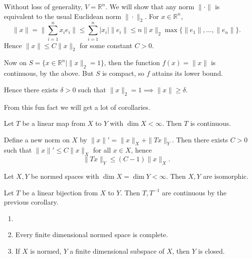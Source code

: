 \documentclass[12pt]{article}
\begin{document}
\begin{proofbox}
	Without loss of generality, $V = \mathbb{R}^{n}$. We will show that any norm $\|\cdot\|$ is equivalent to the usual Euclidean norm $\|\cdot\|_2$. For $x \in \mathbb{R}^{n}$,
	\[
		\|x\| = \biggl\| \sum_{i = 1}^{n} x_i e_i \biggr\| \leq \sum_{i = 1}^{n} |x_i| \|e_i\| \leq n \|x\|_2 \max\{\|e_1\|, \ldots, \|e_n\|\}.
	\]
	Hence $\|x\| \leq C \|x\|_2$ for some constant $C > 0$.

	Now on $S = \{x \in \mathbb{R}^{n} \mid \|x\|_2 = 1\}$, then the function $f(x) = \|x\|$ is continuous, by the above. But $S$ is compact, so $f$ attains its lower bound.

	Hence there exists $\delta > 0$ such that $\|x\|_2 = 1 \implies \|x\| \geq \delta$.
\end{proofbox}

From this fun fact we will get a lot of corollaries.

\begin{corollary}
	Let $T$ be a linear map from $X$ to $Y$ with $\dim X  < \infty$. Then $T$ is continuous.
\end{corollary}

\begin{proofbox}
	Define a new norm on $X$ by $\|x\|' = \|x\|_X + \|Tx\|_Y$. Then there exists $C > 0$ such that $\|x\|' \leq C \|x\|_X$ for all $x \in X$, hence
	\[
	\|Tx\|_Y \leq (C-1) \|x\|_X.
	\]
\end{proofbox}

\begin{corollary}
	Let $X, Y$ be normed spaces with $\dim X = \dim Y < \infty$. Then $X, Y$ are isomorphic.
\end{corollary}

\begin{proofbox}
	Let $T$ be a linear bijection from $X$ to $Y$. Then $T, T^{-1}$ are continuous by the previous corollary.
\end{proofbox}

\begin{corollary}
	\begin{enumerate}[\normalfont(i)]
		\item[]
		\item Every finite dimensional normed space is complete.
		\item If $X$ is normed, $Y$ a finite dimensional subspace of $X$, then $Y$ is closed.
	\end{enumerate}
\end{corollary}
\end{document}
